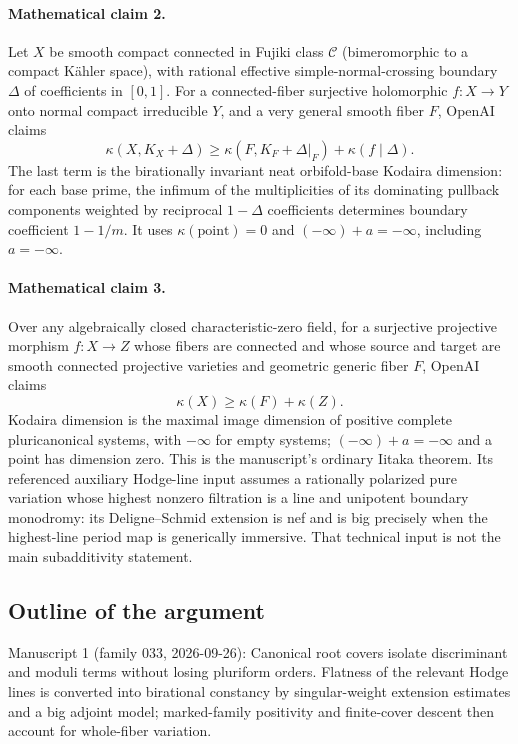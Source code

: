 \documentclass[11pt]{article}
\begin{document}
\paragraph{Mathematical claim 2.} Let $X$ be smooth compact connected in Fujiki class $\mathcal C$ (bimeromorphic to a compact Kähler space), with rational effective simple-normal-crossing boundary $\Delta$ of coefficients in $[0,1]$. For a connected-fiber surjective holomorphic $f:X\to Y$ onto normal compact irreducible $Y$, and a very general smooth fiber $F$, OpenAI claims
\[
\kappa(X,K_X+\Delta)\ge\kappa(F,K_F+\Delta|_F)+\kappa(f\mid\Delta).
\]
The last term is the birationally invariant neat orbifold-base Kodaira dimension: for each base prime, the infimum of the multiplicities of its dominating pullback components weighted by reciprocal $1-\Delta$ coefficients determines boundary coefficient $1-1/m$. It uses $\kappa(\mathrm{point})=0$ and $(-\infty)+a=-\infty$, including $a=-\infty$.

\paragraph{Mathematical claim 3.} Over any algebraically closed characteristic-zero field, for a surjective projective morphism $f:X\to Z$ whose fibers are connected and whose source and target are smooth connected projective varieties and geometric generic fiber $F$, OpenAI claims
\[
\kappa(X)\ge\kappa(F)+\kappa(Z).
\]
Kodaira dimension is the maximal image dimension of positive complete pluricanonical systems, with $-\infty$ for empty systems; $(-\infty)+a=-\infty$ and a point has dimension zero. This is the manuscript's ordinary Iitaka theorem. Its referenced auxiliary Hodge-line input assumes a rationally polarized pure variation whose highest nonzero filtration is a line and unipotent boundary monodromy: its Deligne--Schmid extension is nef and is big precisely when the highest-line period map is generically immersive. That technical input is not the main subadditivity statement.

\subsection{Outline of the argument}
Manuscript 1 (family 033, 2026-09-26): Canonical root covers isolate discriminant and moduli terms without losing pluriform orders. Flatness of the relevant Hodge lines is converted into birational constancy by singular-weight extension estimates and a big adjoint model; marked-family positivity and finite-cover descent then account for whole-fiber variation.
\end{document}
